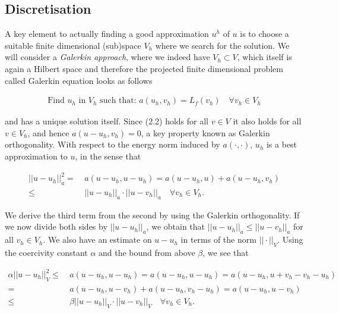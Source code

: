 \documentclass[../draft_1.tex]{subfiles}
\begin{document}
\subsection{Discretisation}
A key element to actually finding a good approximation $u^h$ of $u$ is to choose a suitable finite dimensional (sub)space $V_h$ where we search for the solution. We will consider a \textit{Galerkin approach}, where we indeed have $V_h \subset V$, which itself is again a Hilbert space and therefore the projected finite dimensional problem called Galerkin equation looks as follows
\begin{ceqn}
\begin{equation}
\begin{aligned}
\text{Find } u_h \text{ in } V_h \text{ such that:  } a(u_h, v_h) = L_f(v_h) \quad \forall v_h \in V_h
\end{aligned}
\end{equation}
\end{ceqn}
and has a unique solution itself. Since (2.2) holds for all $v \in V$ it also holds for all $v \in V_h$, and hence $a(u-u_h, v_h) = 0$, a key property known as Galerkin orthogonality. With respect to the energy norm induced by $a(\cdot, \cdot)$, $u_h$ is a best approximation to $u$, in the sense that 
\begin{ceqn}
\begin{equation}
\begin{aligned}
|| u - u_h ||_a^2 =& \ a(u-u_h, u-u_h) = a(u-u_h, u) + a(u-u_h, v_h) \\
\leq& \ ||u - u_h ||_a \cdot || u - v_h ||_a \quad \forall v_h \in V_h.
\end{aligned}
\end{equation}
\end{ceqn}
We derive the third term from the second by using the Galerkin orthogonality. If we now divide both sides by $|| u - u_h||_a$, we obtain that $|| u - u_h ||_a \leq || u -v_h||_a$ for all $v_h \in V_h$. We also have an estimate on $u - u_h$ in terms of the  norm $|| \cdot ||_V$. Using the coercivity constant $\alpha$ and the bound from above $\beta$, we see that
\begin{ceqn}
\begin{equation}
\begin{aligned}
\alpha || u - u_h ||_V^2 \leq& \ a(u-u_h, u-u_h) = a(u-u_h, u- u_h) = a(u-u_h, u +v_h - v_h - u_h ) \\
=& \ a(u-u_h, u - v_h) + a(u - u_h, v_h - u_h) = a(u-u_h, u - v_h) \\
\leq& \ \beta || u - u_h ||_V \cdot || u - v_h||_V  \quad \forall v_h \in V_h.
\end{aligned}
\end{equation}
\end{ceqn}
\end{document}
